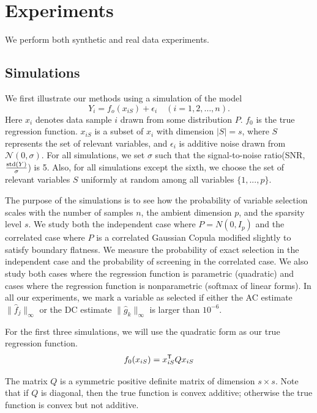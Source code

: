 \def\x{x}
\def\Q{Q}
\def\bds#1{#1}
\def\tts#1{\texttt{\small #1}}

\section{Experiments}
\label{sec:thesims}

We perform both synthetic and real data experiments.

\subsection{Simulations}
We first illustrate our methods using a simulation of the model
\begin{equation}\nonumber
         Y_i = f_o(\x_{iS}) + \epsilon_i \quad (i=1,2,\ldots,n).
\end{equation}
Here $\x_{i}$ denotes data sample $i$ drawn from some distribution $P$. $f_0$ is the true regression function. $\x_{iS}$ is a subset of $\x_i$ with dimension $|S|=s$, where $S$
represents the set of relevant variables, and 
$\epsilon_i$ is additive noise drawn from $\mathcal{N}(0,\sigma)$. For 
all simulations, we set $\sigma$ such that the signal-to-noise ratio(SNR, $\frac{\textrm{std}(Y)}{\sigma}$) is 5. Also, for all simulations except the sixth, we choose the set of relevant variables $S$ uniformly at random among all variables $\{1,...,p\}$.

The purpose of the simulations is to see how the probability of variable selection scales with the number of samples $n$, the ambient dimension $p$, and the sparsity level $s$. We study both the independent case where $P = N(0, I_p)$ and the correlated case where $P$ is a correlated Gaussian Copula modified slightly to satisfy boundary flatness. We measure the probability of exact selection in the independent case and the probability of screening in the correlated case. We also study both cases where the regression function is parametric (quadratic) and cases where the regression function is nonparametric (softmax of linear forms). In all our experiments, we mark a variable as selected if either the AC estimate $\| \hat{f}_j \|_\infty$ or the DC estimate $\| \hat{g}_k \|_\infty$ is larger than $10^{-6}$.

For the first three simulations, we will use the quadratic form as our true regression function.
\[
f_0(x_{iS}) = x_{iS}^\tran \Q x_{iS}
\]

The matrix $\Q$ is a symmetric positive definite matrix of dimension $s \times{} s$. 
Note that if $\Q$ is diagonal, then the true function is convex
additive; 
otherwise the true function is convex but not additive.


